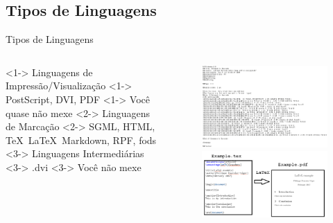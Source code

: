 \documentclass{beamer}
\begin{document}
\subsection{Tipos de Linguagens}
\begin{frame}{Tipos de Linguagens}
    \begin{columns}
        \begin{column}{0.5\textwidth}
            \begin{outline}
                \1 <1-> Linguagens de Impressão/Visualização
                \2 <1-> PostScript, DVI, PDF 
                \2 <1-> Você quase não mexe
                \1 <2-> Linguagens de Marcação      
                \2 <2-> SGML, HTML, \TeX\, \LaTeX\, Markdown, RPF, fods
                \1 <3-> Linguagens Intermediárias 
                \2 <3-> .dvi
                \2 <3-> Você não mexe
            \end{outline}
        \end{column}
        \begin{column}{0.5\textwidth}
            \begin{figure}
                \begin{overprint}
                    \includegraphics[width=0.8\linewidth]{Images/ps.png}
                    \includegraphics[width=0.8\linewidth]{Images/marcacao.png}                                          
                \end{overprint}
            \end{figure}
        \end{column}
    \end{columns}
\end{frame}
\end{document}
